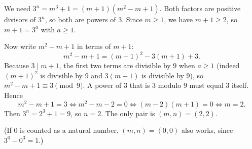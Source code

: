 We need $3^n=m^3+1=(m+1)(m^2-m+1)$. Both factors are positive divisors of $3^n$, so both are powers of $3$. Since $m\ge1$, we have $m+1\ge2$, so $m+1=3^a$ with $a\ge1$.

Now write $m^2-m+1$ in terms of $m+1$:
\[
m^2-m+1=(m+1)^2-3(m+1)+3 .
\]
Because $3\mid m+1$, the first two terms are divisible by $9$ when $a\ge1$ (indeed $(m+1)^2$ is divisible by $9$ and $3(m+1)$ is divisible by $9$), so $m^2-m+1\equiv3\pmod 9$. A power of $3$ that is $3$ modulo $9$ must equal $3$ itself. Hence
\[
m^2-m+1=3\iff m^2-m-2=0\iff (m-2)(m+1)=0\iff m=2 .
\]
Then $3^n=2^3+1=9$, so $n=2$. The only pair is $\boxed{(m,n)=(2,2)}$.

(If $0$ is counted as a natural number, $(m,n)=(0,0)$ also works, since $3^0-0^3=1$.)
